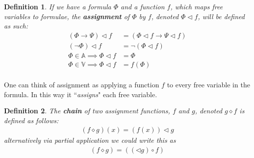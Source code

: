 \documentclass{article}
\newtheorem{defin}{Definition}
\begin{document}
\begin{defin}
If we have a formula $\Phi$ and a function $f$, which maps free variables to formulae,
the \textbf{assignment} of $\Phi$ by $f$, denoted $\Phi \lhd f$, will be defined as such:
\begin{align*}
(\Phi \rightarrow \Psi) \lhd f &= (\Phi \lhd f \rightarrow \Psi \lhd f) \\
(\neg \Phi) \lhd f &= \neg (\Phi \lhd f) \\
\Phi \in \mathbb{A} \implies \Phi \lhd f &= \Phi \\
\Phi \in \mathbb{V} \implies \Phi \lhd f &= f(\Phi) \\
\end{align*}
\end{defin}

One can think of assignment as applying a function $f$ to every free variable in the formula.
In this way it ``\textit{assigns}" each free variable.

\begin{defin}
The \textbf{chain} of two assignment functions, $f$ and $g$, denoted $g \diamond f$ is defined as follows:
\begin{align*}
(f \diamond g) (x) = (f (x)) \lhd g
\end{align*}
alternatively via partial application we could write this as
\begin{align*}
(f \diamond g) = ((\lhd g)\circ f)
\end{align*}
\end{defin}
\end{document}
